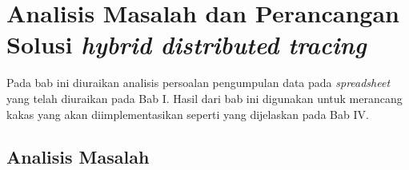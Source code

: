 \chapter{Analisis Masalah dan Perancangan Solusi \textit{hybrid distributed tracing}}

Pada bab ini diuraikan analisis persoalan pengumpulan data pada \textit{spreadsheet} yang telah diuraikan pada Bab I. Hasil dari bab ini digunakan untuk merancang kakas yang akan diimplementasikan seperti yang dijelaskan pada Bab IV.


\section{Analisis Masalah}